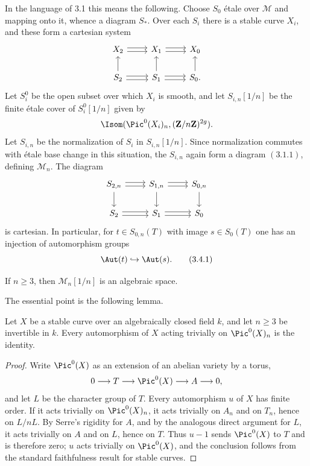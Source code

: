 In the language of 3.1 this means the following. Choose $S_0$ étale over $\mathcal M$ and mapping onto it, whence a diagram $S_*$. Over each $S_i$ there is a stable curve $X_i$, and these form a cartesian system
\[
\begin{tikzcd}
X_2 \arrow[r,shift left=.5ex] \arrow[r,shift right=.5ex] & X_1 \arrow[r,shift left=.5ex] \arrow[r,shift right=.5ex] & X_0\\
S_2 \arrow[u] \arrow[r,shift left=.5ex] \arrow[r,shift right=.5ex] & S_1 \arrow[u] \arrow[r,shift left=.5ex] \arrow[r,shift right=.5ex] & S_0 \arrow[u].
\end{tikzcd}
\]
Let $S_i^0$ be the open subset over which $X_i$ is smooth, and let $S_{i,n}[1/n]$ be the finite étale cover of $S_i^0[1/n]$ given by
\[
  \Isom(\Pic^0(X_i)_n,(\mathbf Z/n\mathbf Z)^{2g}).
\]
Let $S_{i,n}$ be the normalization of $S_i$ in $S_{i,n}[1/n]$. Since normalization commutes with étale base change in this situation, the $S_{i,n}$ again form a diagram \((3.1.1)\), defining $\mathcal M_n$. The diagram
\[
\begin{tikzcd}
S_{2,n} \arrow[r,shift left=.5ex] \arrow[r,shift right=.5ex] \arrow[d] & S_{1,n} \arrow[r,shift left=.5ex] \arrow[r,shift right=.5ex] \arrow[d] & S_{0,n} \arrow[d]\\
S_2 \arrow[r,shift left=.5ex] \arrow[r,shift right=.5ex] & S_1 \arrow[r,shift left=.5ex] \arrow[r,shift right=.5ex] & S_0
\end{tikzcd}
\]
is cartesian. In particular, for $t\in S_{0,n}(T)$ with image $s\in S_0(T)$ one has an injection of automorphism groups
\[
  \Aut(t)\hookrightarrow \Aut(s).
  \tag{3.4.1}
\]

\begin{proposition}
If $n\ge3$, then $\mathcal M_n[1/n]$ is an algebraic space.
\end{proposition}

The essential point is the following lemma.

\begin{lemma}\label{lem:autom}
Let $X$ be a stable curve over an algebraically closed field $k$, and let $n\ge3$ be invertible in $k$. Every automorphism of $X$ acting trivially on $\Pic^0(X)_n$ is the identity.
\end{lemma}

\begin{proof}
Write $\Pic^0(X)$ as an extension of an abelian variety by a torus,
\[
  0\longrightarrow T\longrightarrow \Pic^0(X)\longrightarrow A\longrightarrow 0,
\]
and let $L$ be the character group of $T$. Every automorphism $u$ of $X$ has finite order. If it acts trivially on $\Pic^0(X)_n$, it acts trivially on $A_n$ and on $T_n$, hence on $L/nL$. By Serre's rigidity for $A$, and by the analogous direct argument for $L$, it acts trivially on $A$ and on $L$, hence on $T$. Thus $u-1$ sends $\Pic^0(X)$ to $T$ and is therefore zero; $u$ acts trivially on $\Pic^0(X)$, and the conclusion follows from the standard faithfulness result for stable curves.
\end{proof}

